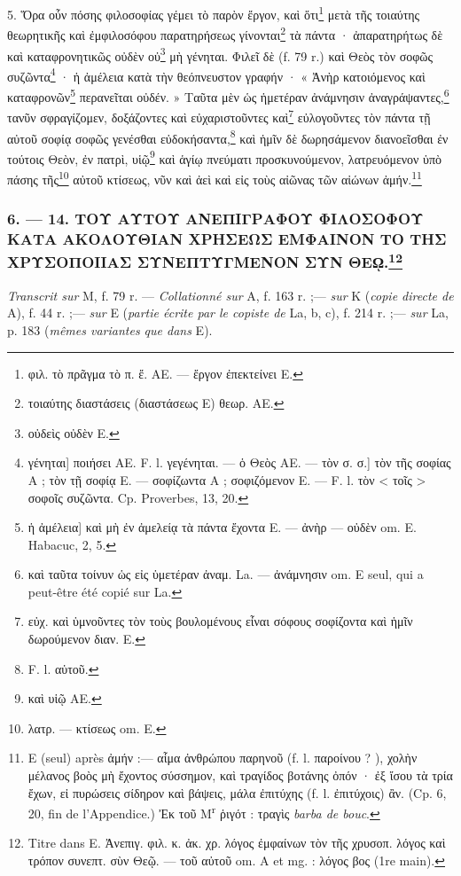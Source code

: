 \documentclass[a4paper, 11pt, oneside, polutonikogreek, french]{article}
\begin{document}
5. Ὅρα οὖν πόσης φιλοσοφίας γέμει τὸ παρὸν ἔργον, καὶ ὅτι\footnote{φιλ. τὸ πρᾶγμα τὸ π. ἔ. AE. --- ἔργον ἐπεκτείνει E.} μετὰ τῆς τοιαύτης θεωρητικῆς καὶ ἐμφιλοσόφου παρατηρήσεως γίνονται\footnote{τοιαύτης διαστάσεις (διαστάσεως E) θεωρ. AE.} τὰ πάντα · ἀπαρατηρήτως δὲ καὶ καταφρονητικῶς οὐδὲν οὐ\footnote{οὐδεὶς οὐδὲν E.} μὴ γένηται. Φιλεῖ δὲ (f. 79 r.) καὶ Θεὸς τὸν σοφῶς συζῶντα\footnote{γένηται] ποιήσει AE. F. l. γεγένηται. --- ὁ Θεὸς AE. --- τὸν σ. σ.] τὸν τῆς σοφίας A ; τὸν τῇ σοφίᾳ E. --- σοφίζωντα A ; σοφιζόμενον E. --- F. l. τὸν < τοῖς > σοφοῖς συζῶντα. Cp. Proverbes, 13, 20.} · ἡ ἀμέλεια κατὰ τὴν θεόπνευστον γραφήν · « Ἀνὴρ κατοιόμενος καὶ καταφρονῶν\footnote{ἡ ἀμέλεια] καὶ μὴ ἐν ἀμελείᾳ τὰ πάντα ἔχοντα E. --- ἀνὴρ --- οὐδὲν om. E. Habacuc, 2, 5.} περανεῖται οὐδέν. » Ταῦτα μὲν ὡς ἡμετέραν ἀνάμνησιν ἀναγράψαντες,\footnote{καὶ ταῦτα τοίνυν ὡς εἰς ὑμετέραν ἀναμ. La. --- ἀνάμνησιν om. E seul, qui a peut-être été copié sur La.} τανῦν σφραγίζομεν, δοξάζοντες καὶ εὐχαριστοῦντες καὶ\footnote{εὐχ. καὶ ὑμνοῦντες τὸν τοὺς βουλομένους εἶναι σόφους σοφίζοντα καὶ ἡμῖν δωρούμενον διαν. E.} εὐλογοῦντες τὸν πάντα τῇ αὐτοῦ σοφίᾳ σοφῶς γενέσθαι εὐδοκήσαντα,\footnote{F. l. αὑτοῦ.} καὶ ἡμῖν δὲ δωρησάμενον διανοεῖσθαι ἐν τούτοις Θεὸν, ἐν πατρὶ, υἱῷ\footnote{καὶ υἱῷ AE.} καὶ ἁγίῳ πνεύματι προσκυνούμενον, λατρευόμενον ὑπὸ πάσης τῆς\footnote{λατρ. --- κτίσεως om. E.} αὐτοῦ κτίσεως, νῦν καὶ ἀεὶ καὶ εἰς τοὺς αἰῶνας τῶν αἰώνων ἀμήν.\footnote{E (seul) après ἀμήν :--- αἷμα ἀνθρώπου παρηνοῦ (f. l. παροίνου ? ), χολὴν μέλανος βοὸς μὴ ἔχοντος σύσσημον, καὶ τραγίδος βοτάνης ὀπόν · ἐξ ἴσου τὰ τρία ἔχων, εἰ πυρώσεις σίδηρον καὶ βάψεις, μάλα ἐπιτύχης (f. l. ἐπιτύχοις) ἂν. (Cp. 6, 20, fin de l'Appendice.) Ἐκ τοῦ M\textsuperscript{r} ῥιγότ : τραγὶς \emph{barba de bouc}.}

\bigskip
\centerline{\EightStarTaper}
\centerline{\EightStarTaper\EightStarTaper}
\bigskip

\subsubsection[6. --- 14. ΤΟΥ ΑΥΤΟΥ ΑΝΕΠΙΓΡΑΦΟΥ ΦΙΛΟΣΟΦΟΥ ΚΑΤΑ ΑΚΟΛΟΥΘΙΑΝ ΧΡΗΣΕΩΣ ΕΜΦΑΙΝΟΝ ΤΟ ΤΗΣ ΧΡΥΣΟΠΟΙΙΑΣ ΣΥΝΕΠΤΥΓΜΕΝΟΝ ΣΥΝ ΘΕῼ.]{6. --- 14. ΤΟΥ ΑΥΤΟΥ ΑΝΕΠΙΓΡΑΦΟΥ ΦΙΛΟΣΟΦΟΥ ΚΑΤΑ ΑΚΟΛΟΥΘΙΑΝ ΧΡΗΣΕΩΣ ΕΜΦΑΙΝΟΝ ΤΟ ΤΗΣ ΧΡΥΣΟΠΟΙΙΑΣ ΣΥΝΕΠΤΥΓΜΕΝΟΝ ΣΥΝ ΘΕῼ.\footnote{Titre dans E. Ἀνεπιγ. φιλ. κ. ἀκ. χρ. λόγος ἐμφαίνων τὸν τῆς χρυσοπ. λόγος καὶ τρόπον συνεπτ. σὺν Θεῷ. --- τοῦ αὐτοῦ om. A et mg. : λόγος βος (1re main).}}

\emph{Transcrit sur} M, f. 79 r. --- \emph{Collationné sur} A, f. 163 r. ;--- \emph{sur} K (\emph{copie directe de} A), f. 44 r. ;--- \emph{sur} E (\emph{partie écrite par le copiste de} La, b, c), f. 214 r. ;--- \emph{sur} La, p. 183 (\emph{mêmes variantes que dans} E).
\end{document}
